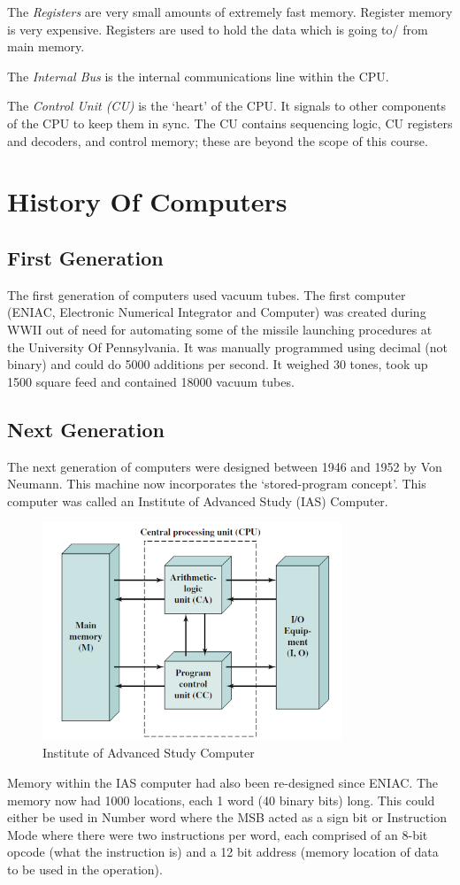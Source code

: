 The \textit{Registers} are very small amounts of extremely fast memory. Register memory is very expensive. Registers are used to hold the data which is going to/ from main memory.

The \textit{Internal Bus} is the internal communications line within the CPU.

The \textit{Control Unit (CU)} is the `heart' of the CPU. It signals to other components of the CPU to keep them in sync. The CU contains sequencing logic, CU registers and decoders, and control memory; these are beyond the scope of this course.

\section*{History Of Computers}
\subsection*{First Generation}
The first generation of computers used vacuum tubes. The first computer (ENIAC, Electronic Numerical Integrator and Computer) was created during WWII out of need for automating some of the missile launching procedures at the University Of Pennsylvania. It was manually programmed using decimal (not binary) and could do 5000 additions per second. It weighed 30 tones, took up 1500 square feed and contained 18000 vacuum tubes.
\subsection*{Next Generation}
The next generation of computers were designed between 1946 and 1952 by Von Neumann. This machine now incorporates the `stored-program concept'. This computer was called an Institute of Advanced Study (IAS) Computer.
\begin{figure}[H]
    \centering
    \includegraphics[width=0.8\textwidth]{assets/ias-computer.png}
    \caption{Institute of Advanced Study Computer}
\end{figure}
Memory within the IAS computer had also been re-designed since ENIAC. The memory now had 1000 locations, each 1 word (40 binary bits) long. This could either be used in Number word where the MSB acted as a sign bit or Instruction Mode where there were two instructions per word, each comprised of an 8-bit opcode (what the instruction is) and a 12 bit address (memory location of data to be used in the operation).